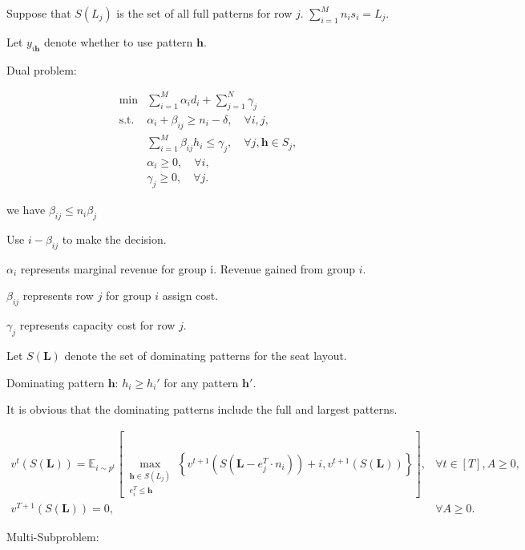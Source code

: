 Suppose that $S(L_{j})$ is the set of all full patterns for row $j$. $\sum_{i=1}^{M} n_{i} s_{i} = L_{j}$.

Let $y_{i \bm{h}}$ denote whether to use pattern $\bm{h}$.

Dual problem:

\begin{equation}
    \begin{array}{ll}
    \min & \sum_{i=1}^M \alpha_i d_i+ \sum_{j=1}^N \gamma_j \\
    \mathrm{s.t.} & \alpha_i+\beta_{i j} \geq n_i-\delta, \quad \forall i, j, \\
    & \sum_{i=1}^M \beta_{i j} h_i \leq \gamma_j, \quad \forall j, \bm{h} \in S_j, \\
    & \alpha_i \geq 0, \quad \forall i, \\
    & \gamma_j \geq 0, \quad \forall j .
    \end{array}
\end{equation}

we have $\beta_{ij} \leq n_{i} \beta_{j}$

Use $i - \beta_{ij}$ to make the decision.

$\alpha_{i}$ represents marginal revenue for group i. Revenue gained from group $i$.

$\beta_{ij}$ represents row $j$ for group $i$ assign cost.

$\gamma_{j}$ represents capacity cost for row $j$.

Let $S(\bm{L})$ denote the set of dominating patterns for the seat layout.

Dominating pattern $\bm{h}$: $h_{i} \geq h_{i}{'}$ for any pattern $\bm{h{'}}$.

It is obvious that the dominating patterns include the full and largest patterns.

\begin{equation}
    \begin{array}{lr}
    v^t(S(\bm{L}))=\mathbb{E}_{i \sim p^t}\left[\max_{\substack{\bm{h} \in S(L_{j}) \\
    e_{i}^{T} \leqslant \bm{h}}}\left\{v^{t+1}(S(\bm{L}- e_{j}^{T} \cdot n_{i}))+ {i}, v^{t+1}(S(\bm{L}))\right\}\right], & \forall t \in[T], A \geqslant 0, \\
    v^{T+1}(S(\bm{L}))=0, & \forall A \geqslant 0.
    \end{array}
\end{equation}

Multi-Subproblem:

